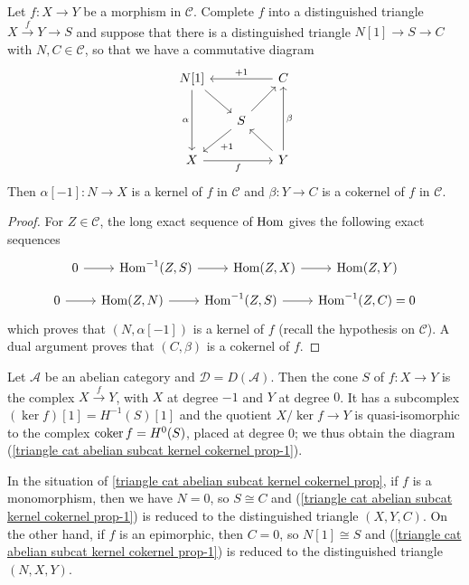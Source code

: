 \begin{proposition}\label{triangle cat abelian subcat kernel cokernel prop}
Let $f:X\to Y$ be a morphism in $\mathcal{C}$. Complete $f$ into a distinguished triangle $X\stackrel{f}{\to}Y\to S$ and suppose that there is a distinguished triangle $N[1]\to S\to C$ with $N,C\in\mathcal{C}$, so that we have a commutative diagram
\begin{equation}\label{triangle cat abelian subcat kernel cokernel prop-1}
\begin{tikzcd}[row sep=6mm,column sep=6mm]
N[1]\ar[rd]\ar[dd,swap,"\alpha"]&&C\ar[ll,swap,"+1"]\\
&S\ar[ld,"+1"]\ar[ru]&\\
X\ar[rr,swap,"f"]&&Y\ar[lu]\ar[uu,swap,"\beta"]
\end{tikzcd}
\end{equation}
Then $\alpha[-1]:N\to X$ is a kernel of $f$ in $\mathcal{C}$ and $\beta:Y\to C$ is a cokernel of $f$ in $\mathcal{C}$.
\end{proposition}
\begin{proof}
For $Z\in\mathcal{C}$, the long exact sequence of $\mathrm{Hom}$ gives the following exact sequences
\[\begin{tikzcd}
0\ar[r]&\Hom^{-1}(Z,S)\ar[r]&\Hom(Z,X)\ar[r]&\Hom(Z,Y)
\end{tikzcd}\]
\vspace*{-4mm}
\[\begin{tikzcd}
0\ar[r]&\Hom(Z,N)\ar[r]&\Hom^{-1}(Z,S)\ar[r]&\Hom^{-1}(Z,C)=0
\end{tikzcd}\]
which proves that $(N,\alpha[-1])$ is a kernel of $f$ (recall the hypothesis on $\mathcal{C}$). A dual argument proves that $(C,\beta)$ is a cokernel of $f$.
\end{proof}

\begin{example}\label{triangle cat abelian subcat as derived eg}
Let $\mathcal{A}$ be an abelian category and $\mathcal{D}=D(\mathcal{A})$. Then the cone $S$ of $f:X\to Y$ is the complex $X\stackrel{f}{\to} Y$, with $X$ at degree $-1$ and $Y$ at degree $0$. It has a subcomplex $(\ker f)[1]=H^{-1}(S)[1]$ and the quotient $X/\ker f\to Y$ is quasi-isomorphic to the complex $\operatorname{coker} f=H^0(S)$, placed at degree $0$; we thus obtain the diagram (\ref{triangle cat abelian subcat kernel cokernel prop-1}).
\end{example}

\begin{example}\label{triangle cat abelian subcat exact sequence eg}
In the situation of \cref{triangle cat abelian subcat kernel cokernel prop}, if $f$ is a monomorphism, then we have $N=0$, so $S\cong C$ and (\ref{triangle cat abelian subcat kernel cokernel prop-1}) is reduced to the distinguished triangle $(X,Y,C)$. On the other hand, if $f$ is an epimorphic, then $C=0$, so $N[1]\cong S$ and (\ref{triangle cat abelian subcat kernel cokernel prop-1}) is reduced to the distinguished triangle $(N,X,Y)$.
\end{example}

